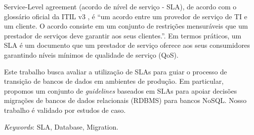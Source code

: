 Service-Level agreement (acordo de n\'ivel de servi\c{c}o - SLA), de acordo com o gloss\'ario oficial da ITIL v3 , \'e ``um acordo entre um provedor de servi\c{c}o de TI e um cliente. O acordo consiste em um conjunto de 
restri\c{c}\~oes mensur\'aveis que um prestador de servi\c{c}os deve garantir aos seus clientes.''. Em termos pr\'aticos, um SLA \'e um documento que um prestador de servi\c{c}o oferece aos seus consumidores garantindo n\'iveis m\'inimos de qualidade de servi\c{c}o (QoS).

Este trabalho busca avaliar a utiliza\c{c}\~ao de SLAs para guiar o processo de transi\c{c}\~ao de bancos de dados em ambientes de produ\c{c}\~ao. Em particular, propomos um conjunto de \textit{guidelines} baseados em SLAs para apoiar decis\~oes migra\c{c}\~oes de bancos de dados relacionais (RDBMS) para bancos NoSQL. Nosso trabalho \'e validado por estudos de caso.

\noindent\textit{Keywords}: SLA, Database, Migration.

